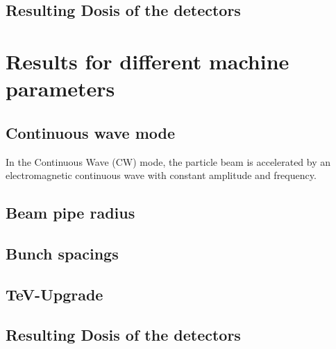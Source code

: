 \subsection{Resulting Dosis of the detectors}
\label{EffectDetectors:BeamOrbit:dosis}

\section{Results for different machine parameters}
\label{EffectDetectors:MachineParameters}
\subsection{Continuous wave mode}
\label{EffectDetectors:MachineParameters:CW}
In the Continuous Wave (CW) mode, the particle beam is accelerated by an electromagnetic continuous wave with constant amplitude and frequency.
\subsection{Beam pipe radius}
\label{EffectDetectors:MachineParameters:beampipe}
\subsection{Bunch spacings}
\label{EffectDetectors:MachineParameters:bunchspacing}
\subsection{TeV-Upgrade}
\label{EffectDetectors:MachineParameters:upgrade}
\subsection{Resulting Dosis of the detectors}
\label{EffectDetectors:MachineParameters:dosis}

